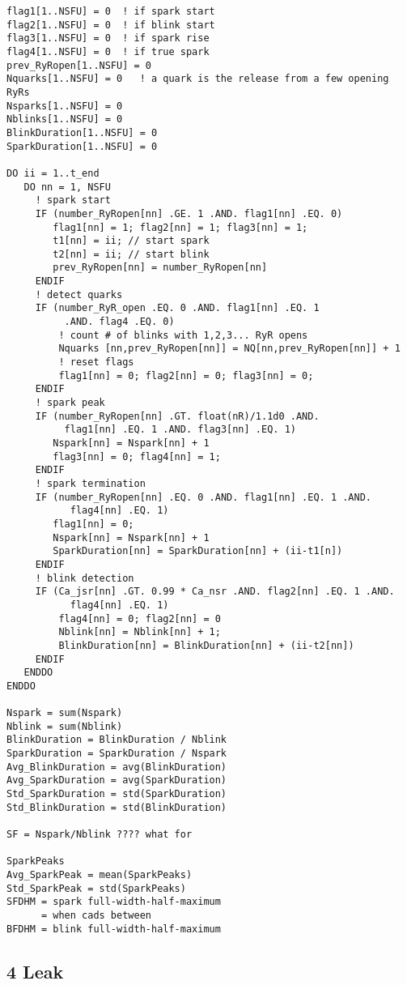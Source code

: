 \begin{lstlisting}
flag1[1..NSFU] = 0  ! if spark start
flag2[1..NSFU] = 0  ! if blink start
flag3[1..NSFU] = 0  ! if spark rise
flag4[1..NSFU] = 0  ! if true spark
prev_RyRopen[1..NSFU] = 0
Nquarks[1..NSFU] = 0   ! a quark is the release from a few opening RyRs
Nsparks[1..NSFU] = 0
Nblinks[1..NSFU] = 0
BlinkDuration[1..NSFU] = 0
SparkDuration[1..NSFU] = 0

DO ii = 1..t_end      
   DO nn = 1, NSFU
     ! spark start
     IF (number_RyRopen[nn] .GE. 1 .AND. flag1[nn] .EQ. 0)
        flag1[nn] = 1; flag2[nn] = 1; flag3[nn] = 1;
        t1[nn] = ii; // start spark
        t2[nn] = ii; // start blink
        prev_RyRopen[nn] = number_RyRopen[nn]
     ENDIF
     ! detect quarks
     IF (number_RyR_open .EQ. 0 .AND. flag1[nn] .EQ. 1 
          .AND. flag4 .EQ. 0)
         ! count # of blinks with 1,2,3... RyR opens
         Nquarks [nn,prev_RyRopen[nn]] = NQ[nn,prev_RyRopen[nn]] + 1 
         ! reset flags
         flag1[nn] = 0; flag2[nn] = 0; flag3[nn] = 0;
     ENDIF
     ! spark peak
     IF (number_RyRopen[nn] .GT. float(nR)/1.1d0 .AND. 
          flag1[nn] .EQ. 1 .AND. flag3[nn] .EQ. 1)
        Nspark[nn] = Nspark[nn] + 1
        flag3[nn] = 0; flag4[nn] = 1;
     ENDIF
     ! spark termination 
     IF (number_RyRopen[nn] .EQ. 0 .AND. flag1[nn] .EQ. 1 .AND.
           flag4[nn] .EQ. 1)
        flag1[nn] = 0; 
        Nspark[nn] = Nspark[nn] + 1
        SparkDuration[nn] = SparkDuration[nn] + (ii-t1[n])
     ENDIF
     ! blink detection
     IF (Ca_jsr[nn] .GT. 0.99 * Ca_nsr .AND. flag2[nn] .EQ. 1 .AND.
           flag4[nn] .EQ. 1)
         flag4[nn] = 0; flag2[nn] = 0
         Nblink[nn] = Nblink[nn] + 1;
         BlinkDuration[nn] = BlinkDuration[nn] + (ii-t2[nn])
     ENDIF
   ENDDO
ENDDO

Nspark = sum(Nspark)
Nblink = sum(Nblink)
BlinkDuration = BlinkDuration / Nblink
SparkDuration = SparkDuration / Nspark
Avg_BlinkDuration = avg(BlinkDuration)
Avg_SparkDuration = avg(SparkDuration)
Std_SparkDuration = std(SparkDuration)
Std_BlinkDuration = std(BlinkDuration)

SF = Nspark/Nblink ???? what for

SparkPeaks
Avg_SparkPeak = mean(SparkPeaks)
Std_SparkPeak = std(SparkPeaks)
SFDHM = spark full-width-half-maximum
      = when cads between 
BFDHM = blink full-width-half-maximum
\end{lstlisting}

\subsection{4 Leak}
\label{sec:leak_spark-analysis}

